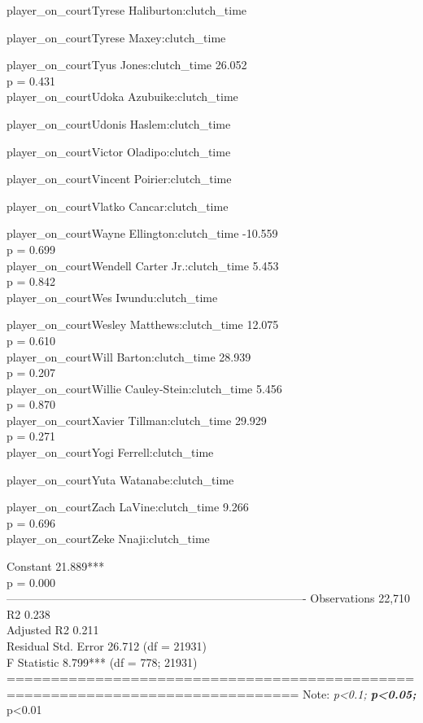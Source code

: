 \documentclass[
  landscape]{article}
\begin{document}
player\_on\_courtTyrese Haliburton:clutch\_time

player\_on\_courtTyrese Maxey:clutch\_time

player\_on\_courtTyus Jones:clutch\_time 26.052\\
p = 0.431\\
player\_on\_courtUdoka Azubuike:clutch\_time

player\_on\_courtUdonis Haslem:clutch\_time

player\_on\_courtVictor Oladipo:clutch\_time

player\_on\_courtVincent Poirier:clutch\_time

player\_on\_courtVlatko Cancar:clutch\_time

player\_on\_courtWayne Ellington:clutch\_time -10.559\\
p = 0.699\\
player\_on\_courtWendell Carter Jr.:clutch\_time 5.453\\
p = 0.842\\
player\_on\_courtWes Iwundu:clutch\_time

player\_on\_courtWesley Matthews:clutch\_time 12.075\\
p = 0.610\\
player\_on\_courtWill Barton:clutch\_time 28.939\\
p = 0.207\\
player\_on\_courtWillie Cauley-Stein:clutch\_time 5.456\\
p = 0.870\\
player\_on\_courtXavier Tillman:clutch\_time 29.929\\
p = 0.271\\
player\_on\_courtYogi Ferrell:clutch\_time

player\_on\_courtYuta Watanabe:clutch\_time

player\_on\_courtZach LaVine:clutch\_time 9.266\\
p = 0.696\\
player\_on\_courtZeke Nnaji:clutch\_time

Constant 21.889***\\
p = 0.000\\
-------------------------------------------------------------------------------
Observations 22,710\\
R2 0.238\\
Adjusted R2 0.211\\
Residual Std. Error 26.712 (df = 21931)\\
F Statistic 8.799*** (df = 778; 21931)
===============================================================================
Note: \emph{p\textless0.1; \textbf{p\textless0.05; }}p\textless0.01
\end{document}
